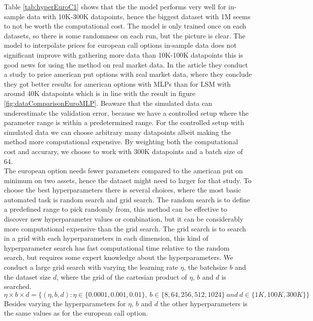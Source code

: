


Table \ref{tab:hyperEuroC1} shows that the the model performs very well for in-sample data with 10K-300K datapoints, hence the biggest dataset with 1M seems to not be worth the computational cost. The model is only trained once on each datasets, so there is some randomness on each run, but the picture is clear. The model to interpolate prices for european call options in-sample data does not significant improve with gathering more data than 10K-100K datapoints this is good news for using the method on real market data. In the article \parencite{GasparRaquel20} they conduct a study to price american put options with real market data, where they conclude they got better results for american options with MLPs than for LSM with around 40K datapoints which is in line with the result in figure \ref{fig:dataComparisonEuroMLP}. Beaware that the simulated data can underestimate the validation error, because we have a controlled setup where the parameter range is within a predetermined range. For the controlled setup with simulated data we can choose arbitrary many datapoints albeit making the method more computational expensive. By weighting both the computational cost and accurary, we choose to work with 300K datapoints and a batch size of 64. \\

The european option needs fewer parameters compared to the american put on minimum on two assets, hence the dataset might need to larger for that study. To choose the best hyperparameters there is several choices, where the most basic automated task is random search and grid search. The random search is to define a predefined range to pick randomly from, this method can be effective to discover new hyperparameter values or combination, but it can be considerably more computational expensive than the grid search. The grid search is to search in a grid with each hyperparameters in each dimension, this kind of hyperparameter search has fast computational time relative to the random search, but requires some expert knowledge about the hyperparameters. We conduct a large grid search with varying the learning rate $\eta$, the batchsize $b$ and the dataset size $d$, where the grid of the cartesian product of $\eta$, $b$ and $d$ is searched.
$$\eta \times b \times d = \{(\eta,b, d) : \eta \in \{0.0001, 0.001, 0.01 \}, \ b \in \{8, 64, 256, 512, 1024\} \ and \ d \in\{1K,100K,300K \} \}$$
Besides varying the hyperparameters for $\eta$, $b$ and $d$ the other hyperparameters is the same values as for the european call option.\\

